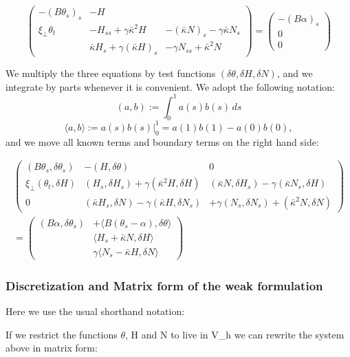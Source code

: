 \[\begin{pmatrix}
-(B\theta_s)_s & -H &  \\
\xi_\perp\theta_t & 
- H_{ss} + \gamma \bar \kappa^2H &
- (\bar\kappa N)_s - \gamma\bar\kappa N_s \\
 & 
\bar \kappa H_s +\gamma(\bar \kappa H)_s &
 - \gamma N_{ss} + \bar \kappa^2 N
\end{pmatrix}
%
=
\begin{pmatrix}
-(B\alpha)_s\\
0\\
0
\end{pmatrix}\]

We multiply the three equations by test functions
$(\delta \theta, \delta H, \delta N)$, and we integrate by parts
whenever it is convenient. We adopt the following notation:
\[
(a,b) := \int_0^1 a(s) b(s) \,d s
\]
\[
\langle a,b \rangle := a(s) b(s) \big|^1_0 = a(1)b(1)-a(0)b(0),
\]
and we move all known terms and boundary terms on the right hand side:

\begin{multline}
\begin{pmatrix}
(B\theta_s, \delta \theta_s)  &  -(H,\delta\theta)  & 0 \\
\xi_\perp(\theta_t, \delta H) & 
(H_{s}, \delta H_s) 
+ \gamma (\bar \kappa^2 H, \delta H ) &
 (\bar\kappa N, \delta H_s) 
- \gamma(\bar\kappa N_s, \delta H) \\
0 & 
(\bar \kappa H_s, \delta N) 
-\gamma(\bar \kappa H, \delta N_s) &
%
%
+ \gamma(N_{s},\delta N_s) 
+ (\bar \kappa^2 N, \delta N)
\end{pmatrix}
%
\\
=
\begin{pmatrix}
(B\alpha, \delta \theta_s)& +\langle B(\theta_s-\alpha), \delta \theta\rangle\\
& \langle H_s+\bar\kappa N,\delta H\rangle
\\
&\gamma\langle N_{s}-\bar \kappa H, \delta N \rangle 
\end{pmatrix}
\end{multline}

\subsubsection{Discretization and Matrix form of the weak formulation}\label{matrix-form-of-the-weak-formulation}

Here we use the usual shorthand notation:


If we restrict the functions $\theta$, H and N to live in V_h we can rewrite the system above in matrix form:

